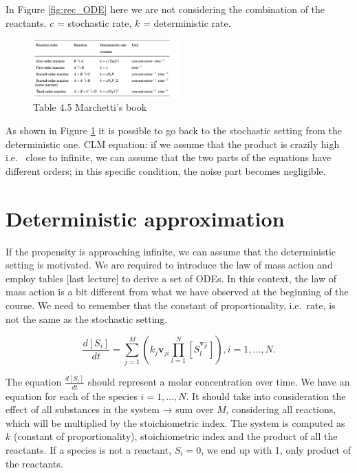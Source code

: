   \noindent
  In Figure \ref{fig:rec_ODE} here we are not considering the combination of the reactants.
  $c$ = stochastic rate, $k$ = deterministic rate.

  \begin{figure}
    \centering
    \includegraphics[width=0.5\textwidth]{reaction_rates.png}
    \caption{Table 4.5 Marchetti's book}
    \label{fig:rec_rates}
  \end{figure}

  \noindent
  As shown in Figure \ref{fig:rec_rates} it is possible to go back to the stochastic setting from the deterministic one.
  CLM equation: if we assume that the product is crazily high i.e. ~close to infinite, we can assume that the two parts of the equations have different orders; in this specific condition, the noise part becomes negligible.

\section{Deterministic approximation}
If the propensity is approaching infinite, we can assume that the deterministic setting is motivated.
We are required to introduce the law of mass action and employ tables {[}last lecture{]} to derive a set of ODEs.
In this context, the law of mass action is a bit different from what we have observed at the beginning of the course.
We need to remember that the constant of proportionality, i.e.~rate, is not the same as the stochastic setting.

$$ \frac{d[S_i]}{dt}= \sum^M_{j=1}( k_j\mathbf{v}_{ji}\prod^{N}_{l=1}{[S_l^{\mathbf{v}^{-}_{jl}}]}) ,i = 1,...,N.$$

\noindent
The equation $\frac{d[S_i]}{dt}$ should represent a molar concentration over time.
We have an equation for each of the species $i=1,…,N$.
It should take into consideration the effect of all substances in the system → sum over $M$, considering all reactions, which will be multiplied by the stoichiometric index.
The system is computed as $k$ (constant of proportionality), stoichiometric index and the product of all the reactants.
If a species is not a reactant, $S_i=0$, we end up with 1, only product of the reactants.

